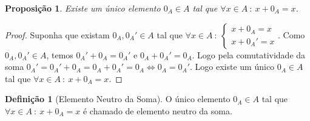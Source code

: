 \documentclass{article}
\theoremstyle{plain}
\newtheorem{prop}{Proposição}[section]
\theoremstyle{definition}
\newtheorem{definicao}{Definição}[section]
\theoremstyle{remark}
\begin{document}
\begin{prop}
	Existe um único elemento $0_A\in A$ tal que $ \forall x\in A \: : \: x+0_A = x$.
\end{prop}
\begin{proof}
	Suponha que existam $0_A, 0_A'\in A$ tal que $\forall x\in A \: : \:  \begin{cases} x+0_A = x \\ x+0_A' = x\end{cases}$. Como $0_A,0_A' \in A$, temos $0_A'+ 0_A = 0_A'$ e $0_A + 0_A' = 0_A$. Logo pela comutatividade da soma $0_A' = 0_A' + 0_A = 0_A +0_A' = 0_A \iff 0_A = 0_A'$.  
		Logo existe um único $0_A\in A$ tal que $\forall x\in A \: : \: x+0_A = x$.
\end{proof}
\begin{definicao}[Elemento Neutro da Soma]
	O único elemento $0_A\in A$ tal que $\forall x\in A \: : \: x+0_A  = x$ é chamado de elemento neutro da soma.
\end{definicao}
\end{document}
